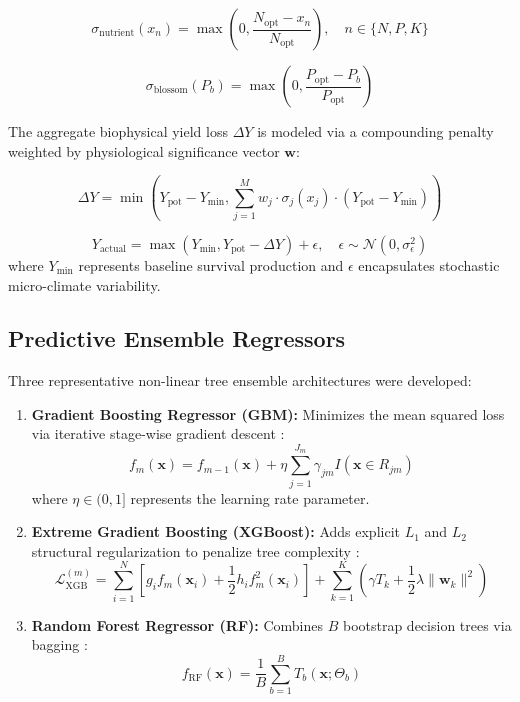 \documentclass[conference]{IEEEtran}
\begin{document}
\begin{equation}
\sigma_{\text{nutrient}}(x_n) = \max\left(0, \frac{N_{\text{opt}} - x_n}{N_{\text{opt}}}\right), \quad n \in \{N, P, K\}
\end{equation}

\begin{equation}
\sigma_{\text{blossom}}(P_b) = \max\left(0, \frac{P_{\text{opt}} - P_b}{P_{\text{opt}}}\right)
\end{equation}

The aggregate biophysical yield loss $\Delta Y$ is modeled via a compounding penalty weighted by physiological significance vector $\mathbf{w}$:

\begin{equation}
\Delta Y = \min\left(Y_{\text{pot}} - Y_{\text{min}}, \sum_{j=1}^{M} w_j \cdot \sigma_j(x_j) \cdot (Y_{\text{pot}} - Y_{\text{min}})\right)
\end{equation}

\begin{equation}
Y_{\text{actual}} = \max\left(Y_{\text{min}}, Y_{\text{pot}} - \Delta Y\right) + \epsilon, \quad \epsilon \sim \mathcal{N}(0, \sigma_\epsilon^2)
\end{equation}
where $Y_{\text{min}}$ represents baseline survival production and $\epsilon$ encapsulates stochastic micro-climate variability.

\subsection{Predictive Ensemble Regressors}
Three representative non-linear tree ensemble architectures were developed:
\begin{enumerate}
    \item \textbf{Gradient Boosting Regressor (GBM):} Minimizes the mean squared loss via iterative stage-wise gradient descent \cite{friedman2001}:
    \begin{equation}
    f_m(\mathbf{x}) = f_{m-1}(\mathbf{x}) + \eta \sum_{j=1}^{J_m} \gamma_{jm} I(\mathbf{x} \in R_{jm})
    \end{equation}
    where $\eta \in (0, 1]$ represents the learning rate parameter.
    \item \textbf{Extreme Gradient Boosting (XGBoost):} Adds explicit $L_1$ and $L_2$ structural regularization to penalize tree complexity \cite{chen2016}:
    \begin{equation}
    \mathcal{L}_{\text{XGB}}^{(m)} = \sum_{i=1}^{N} \left[ g_i f_m(\mathbf{x}_i) + \frac{1}{2} h_i f_m^2(\mathbf{x}_i) \right] + \sum_{k=1}^{K} \left( \gamma T_k + \frac{1}{2}\lambda \|\mathbf{w}_k\|^2 \right)
    \end{equation}
    \item \textbf{Random Forest Regressor (RF):} Combines $B$ bootstrap decision trees via bagging \cite{breiman2001}:
    \begin{equation}
    f_{\text{RF}}(\mathbf{x}) = \frac{1}{B} \sum_{b=1}^{B} T_b(\mathbf{x}; \Theta_b)
    \end{equation}
\end{enumerate}
\end{document}
